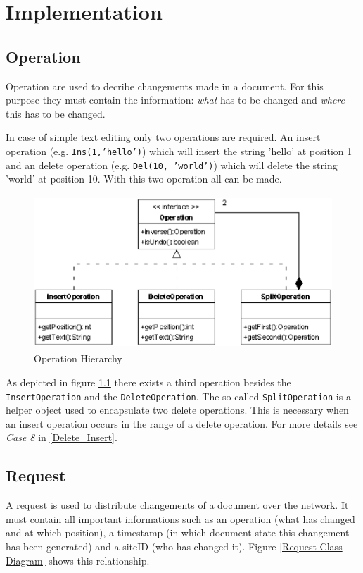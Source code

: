 
\chapter{Implementation}

\section{Operation}
Operation are used to decribe changements made in a document. For this purpose they must contain the information: \emph{what} has to be changed and \emph{where} this has to be changed.

In case of simple text editing only two operations are required. An insert operation (e.g. \texttt{Ins(1,'hello')}) which will insert the string 'hello' at position 1 and an delete operation (e.g. \texttt{Del(10, 'world')}) which will delete the string 'world' at position 10. With this two operation all can be made.

\begin{figure}[H]
\centering
\includegraphics[height=5.74cm,width=11.59cm]{../../images/algo-impl/operation_classdiagram.eps}
\caption{Operation Hierarchy}
\label{Operation Hierarchy}
\end{figure}

\label{Split_Operation}
As depicted in figure \ref{Operation Hierarchy} there exists a third operation besides the \texttt{InsertOperation} and the \texttt{DeleteOperation}. The so-called \texttt{SplitOperation} is a helper object used to encapsulate two delete operations. This is necessary when an insert operation occurs in the range of a delete operation. For more details see \emph{Case 8} in \ref{Delete_Insert}.

\section{Request}
A request is used to distribute changements of a document over the network. It must contain all important informations such as an operation (what has changed and at which position), a timestamp (in which document state this changement has been generated) and a siteID (who has changed it). Figure \ref{Request Class Diagram} shows this relationship.

